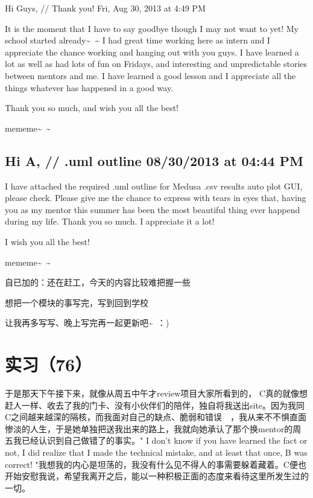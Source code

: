 \documentclass[12pt]{book}
\begin{document}
Hi Guys,  // Thank you!  Fri, Aug 30, 2013 at 4:49 PM

It is the moment that I have to say goodbye though I may not want to yet! My school started already\textasciitilde{}~\textasciitilde{}
I had great time working here as intern and I appreciate the chance working and hanging out with you guys. I have learned a lot as well as had lots of fun on Fridays, and interesting and unpredictable stories between mentors and me. I have learned a good lesson and I appreciate all the things whatever has happened in a good way.

Thank you so much, and wish you all the best!

mememe\textasciitilde{}~\textasciitilde{}

\subsection{Hi A,   // .uml outline 08/30/2013 at 04:44 PM}
\label{sec-5-78-2}

I have attached the required .uml outline for Medusa .csv results auto plot GUI, please check.
Please give me the chance to express with tears in eyes that, having you as my mentor this summer has been the most beautiful thing ever happend during my life. Thank you so much. I appreciate it a lot!

I wish you all the best!

mememe\textasciitilde{}~\textasciitilde{}

自已加的：还在赶工，今天的内容比较难把握一些

想把一个模块的事写完，写到回到学校

让我再多写写、晚上写完再一起更新吧\textasciitilde{}~：)

\section{实习（76）　}
\label{sec-5-79}

于是那天下午接下来，就像从周五中午才review项目大家所看到的， C真的就像想赶人一样、收去了我的门卡、没有小伙伴们的陪伴，独自将我送出site。因为我同C之间越来越深的隔核，而我面对自己的缺点、脆弱和错误　，我从来不不惧直面惨淡的人生，于是她单独把送我出来的路上，我就向她承认了那个换mentor的周五我已经认识到自己做错了的事实。" I don't know if you have learned the fact or not, I did realize that I made the technical mistake, and at least that once, B was correct! "我想我的内心是坦荡的，我没有什么见不得人的事需要躲着藏着。C便也开始安慰我说，希望我离开之后，能以一种积极正面的态度来看待这里所发生过的一切。　
\end{document}
